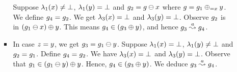 \begin{enumerate}
\begin{enumerate}
\begin{itemize}
    Suppose $\lambda_1(x)\neq\bot$, 
    $\lambda_1(y)=\bot$ and
    $g_2=g\ominus{\ensuremath{x}}$ where $g=g_1\oplus_{={x}}{y}$.
    We define $g_4=g_2$.
    We get $\lambda_3(x)=\bot$ and 
    $\lambda_3(y)=\bot$.
    Observe $g_2$ is in $(g_1\ominus{\ensuremath{x}})\oplus{\ensuremath{y}}$.
    This means 
    $g_4\in(g_3\oplus{\ensuremath{y}})$,
    and hence $g_3\stackrel{a}{\leadsto}g_4$.
  \item In case $z=y$, we get $g_3=g_1\ominus{\ensuremath{y}}$.
    Suppose $\lambda_1(x)=\bot$, 
    $\lambda_1(y)\neq\bot$ and 
    $g_2=g_1$.
    Define $g_4=g_2$.
    We have $\lambda_3(x)=\bot$ and
    $\lambda_3(y)=\bot$.
    Observe that $g_1\in(g_1\ominus{\ensuremath{y}})\oplus{\ensuremath{y}}$.
    Hence, $g_4\in(g_3\oplus{\ensuremath{y}})$.
    We deduce $g_3\stackrel{a}{\leadsto}g_4$.    

\end{itemize}
\end{enumerate}
\end{enumerate}
